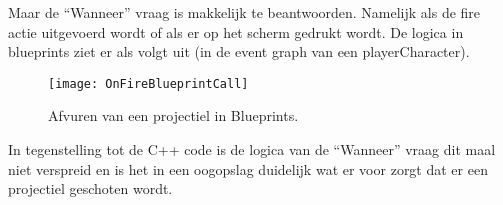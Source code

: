 Maar de “Wanneer” vraag is makkelijk te beantwoorden. Namelijk als de fire actie uitgevoerd wordt of als er op het scherm gedrukt wordt. De logica in blueprints ziet er als volgt uit (in de event graph van een playerCharacter).

\begin{figure}[!ht]
  \centering
    \texttt{[image: OnFireBlueprintCall]}
    \caption{Afvuren van een projectiel in Blueprints.}
\end{figure}

In tegenstelling tot de C++ code is de logica van de “Wanneer” vraag dit maal niet verspreid en is het in een oogopslag duidelijk wat er voor zorgt dat er een projectiel geschoten wordt.